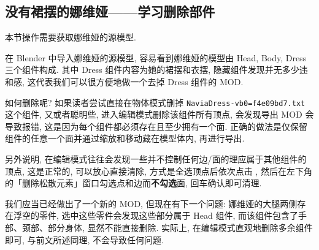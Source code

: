         \subsection{没有裙摆的娜维娅——学习删除部件}
            \par 本节操作需要获取娜维娅的源模型.
            \par 在 Blender 中导入娜维娅的源模型, 容易看到娜维娅的模型由 Head, Body, Dress 三个组件构成. 其中 Dress 组件内容为她的裙摆和衣摆, 隐藏组件发现并无多少违和感, 这代表我们可以很方便地做一个去掉 Dress 组件的 MOD.
            \par 如何删除呢? 如果读者尝试直接在物体模式删掉 \texttt{NaviaDress-vb0=f4e09bd7.txt} 这个组件, 又或者聪明些, 进入编辑模式删除该组件所有顶点, 会发现导出 MOD 会导致报错, 这是因为每个组件都必须存在且至少拥有一个面. 正确的做法是仅保留组件的任意一个面并通过缩放和移动藏在模型体内, 再进行导出.
            \par 另外说明, 在编辑模式往往会发现一些并不控制任何边/面的理应属于其他组件的顶点, 这是正常的, 可以放心直接清除, 方式是全选顶点后依次点击 , 然后在左下角的「删除松散元素」窗口勾选点和边而\textbf{不勾选}面, 回车确认即可清理.
            \par 我们应当已经做出了一个新的 MOD, 但现在有下一个问题: 娜维娅的大腿两侧存在浮空的零件, 选中这些零件会发现这些部分属于 Head 组件, 而该组件包含了手部、颈部、部分身体, 显然不能直接删除. 实际上, 在编辑模式直观地删除多余组件即可, 与前文所述同理, 不会导致任何问题.

